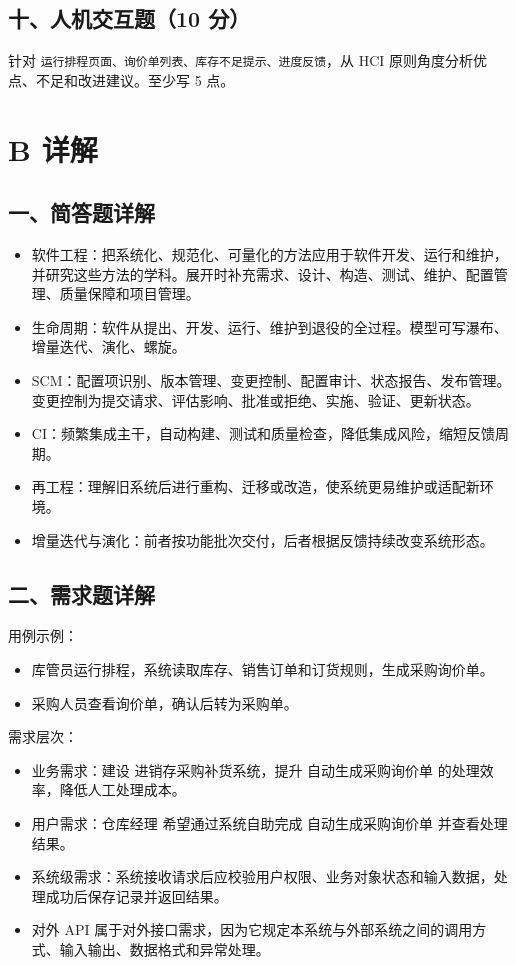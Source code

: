 \documentclass[UTF8,zihao=-4]{ctexart}
\begin{document}
\subsection{十、人机交互题（10 分）}


针对 \texttt{运行排程页面、询价单列表、库存不足提示、进度反馈}，从 HCI 原则角度分析优点、不足和改进建议。至少写 5 点。


\section{B 详解}


\subsection{一、简答题详解}


\begin{itemize}
\item 软件工程：把系统化、规范化、可量化的方法应用于软件开发、运行和维护，并研究这些方法的学科。展开时补充需求、设计、构造、测试、维护、配置管理、质量保障和项目管理。
\item 生命周期：软件从提出、开发、运行、维护到退役的全过程。模型可写瀑布、增量迭代、演化、螺旋。
\item SCM：配置项识别、版本管理、变更控制、配置审计、状态报告、发布管理。变更控制为提交请求、评估影响、批准或拒绝、实施、验证、更新状态。
\item CI：频繁集成主干，自动构建、测试和质量检查，降低集成风险，缩短反馈周期。
\item 再工程：理解旧系统后进行重构、迁移或改造，使系统更易维护或适配新环境。
\item 增量迭代与演化：前者按功能批次交付，后者根据反馈持续改变系统形态。
\end{itemize}



\subsection{二、需求题详解}


用例示例：


\begin{itemize}
\item 库管员运行排程，系统读取库存、销售订单和订货规则，生成采购询价单。
\item 采购人员查看询价单，确认后转为采购单。
\end{itemize}


需求层次：


\begin{itemize}
\item 业务需求：建设 进销存采购补货系统，提升 自动生成采购询价单 的处理效率，降低人工处理成本。
\item 用户需求：仓库经理 希望通过系统自助完成 自动生成采购询价单 并查看处理结果。
\item 系统级需求：系统接收请求后应校验用户权限、业务对象状态和输入数据，处理成功后保存记录并返回结果。
\item 对外 API 属于对外接口需求，因为它规定本系统与外部系统之间的调用方式、输入输出、数据格式和异常处理。
\end{itemize}
\end{document}

